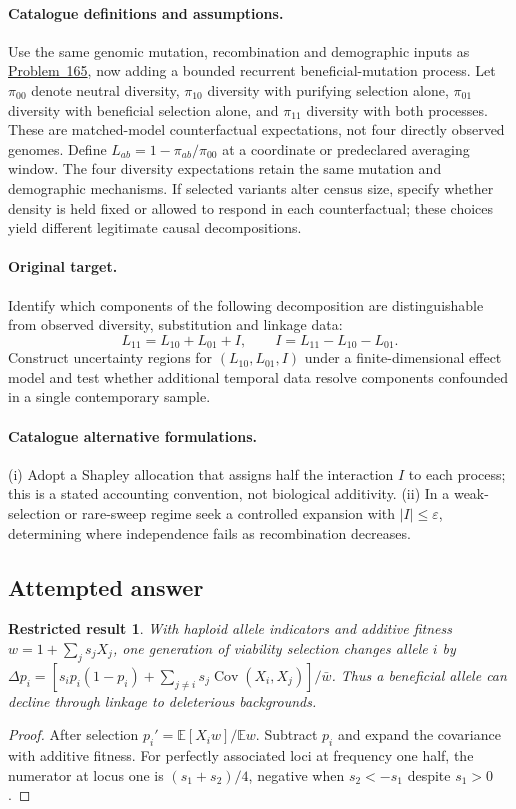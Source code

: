\documentclass[11pt]{article}
\newcommand{\E}{\mathbb E}
\providecommand{\E}{\mathbb E}
\newtheorem{attemptresult}{Restricted result}[section]
\begin{document}
\paragraph{Catalogue definitions and assumptions.}
Use the same genomic mutation, recombination and demographic inputs as \href{https://we-solve.github.io/problems/genome-wide-background-selection-7614b7fa/}{Problem~165}, now adding a bounded recurrent beneficial-mutation process. Let $\pi_{00}$ denote neutral diversity, $\pi_{10}$ diversity with purifying selection alone, $\pi_{01}$ diversity with beneficial selection alone, and $\pi_{11}$ diversity with both processes. These are matched-model counterfactual expectations, not four directly observed genomes. Define $L_{ab}=1-\pi_{ab}/\pi_{00}$ at a coordinate or predeclared averaging window. The four diversity expectations retain the same mutation and demographic mechanisms. If selected variants alter census size, specify whether density is held fixed or allowed to respond in each counterfactual; these choices yield different legitimate causal decompositions.
\paragraph{Original target.}
Identify which components of the following decomposition are distinguishable from observed diversity, substitution and linkage data:
\[
 L_{11}=L_{10}+L_{01}+I,\qquad
 I=L_{11}-L_{10}-L_{01}.
\]
Construct uncertainty regions for $(L_{10},L_{01},I)$ under a finite-dimensional effect model and test whether additional temporal data resolve components confounded in a single contemporary sample.
\paragraph{Catalogue alternative formulations.}
(i) Adopt a Shapley allocation that assigns half the interaction $I$ to each process; this is a stated accounting convention, not biological additivity. (ii) In a weak-selection or rare-sweep regime seek a controlled expansion with $|I|\le\varepsilon$, determining where independence fails as recombination decreases.
\subsection{Attempted answer}
\begin{attemptresult}
With haploid allele indicators and additive fitness $w=1+\sum_js_jX_j$, one generation of viability selection changes allele $i$ by $\Delta p_i=[s_ip_i(1-p_i)+\sum_{j\ne i}s_j\operatorname{Cov}(X_i,X_j)]/\bar w$. Thus a beneficial allele can decline through linkage to deleterious backgrounds.
\end{attemptresult}
\begin{proof}
After selection $p_i\prime=\E[X_iw]/\E w$. Subtract $p_i$ and expand the covariance with additive fitness. For perfectly associated loci at frequency one half, the numerator at locus one is $(s_1+s_2)/4$, negative when $s_2<-s_1$ despite $s_1>0$.
\end{proof}
\end{document}
